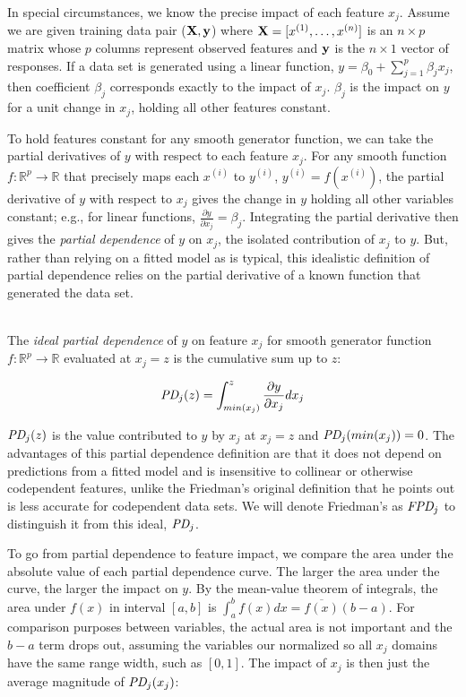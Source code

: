 \documentclass[11pt]{article}
\newcommand{\todo}[1]{{{\small\color{red}{[#1]}}}}
\renewcommand{\xi}{x^{(i)}}
\begin{document}
In special circumstances, we know the precise impact of each feature $x_j$. Assume we are given training data pair ($\bf X, y$) where ${\bf X} = [x^{(1)}, \ldots, x^{(n)}]$ is an $n \times p$ matrix whose $p$ columns represent observed features and ${\bf y}$ is the $n \times 1$ vector of responses.  If a data set is generated using a linear function, $y = \beta_0 + \sum_{j=1}^p \beta_j x_j$, \todo{assumes independence of $x_j$? I don't think so since we have complete equation} then coefficient $\beta_j$ corresponds exactly to the impact of $x_j$.  $\beta_j$ is the impact on $y$ for a unit change in $x_j$, holding all other features constant.

To hold features constant for any smooth generator function, we can take the partial derivatives of $y$ with respect to each feature $x_j$. For any smooth function $f:\mathbb{R}^{p} \rightarrow \mathbb{R}$ that precisely maps each $\xi$ to $y^{(i)}$, ${y^{(i)}} = f(\xi)$, the partial derivative of $y$ with respect to $x_j$ gives the change in $y$ holding all other variables constant; e.g., for linear functions, $\frac{\partial y}{\partial x_j}=\beta_j$. Integrating the partial derivative then gives the {\em partial dependence}  of $y$ on $x_j$, the isolated contribution of $x_j$ to $y$. But, rather than relying on a fitted model as is typical, this idealistic definition of partial dependence relies on the partial derivative of a known function that generated the data set.

~\\
 The {\em ideal partial dependence} of $y$ on feature $x_j$ for smooth generator function $f:\mathbb{R}^{p} \rightarrow \mathbb{R}$ evaluated at $x_j = z$ is the cumulative sum up to $z$:

\begin{equation}\label{eq:pd}
\text{\it PD}_j(z) = \int_{min(x_j)}^z \frac{\partial y}{\partial x_j} dx_j
\end{equation}

$\text{\it PD}_j(z)$ is the value contributed to $y$ by $x_j$ at $x_j = z$ and $\text{\it PD}_j(min(x_j))=0$. The advantages of this partial dependence definition are that it does not depend on predictions from a fitted model and is insensitive to collinear or otherwise codependent features, unlike the Friedman's original definition that he points out is less accurate for codependent data sets. We will denote Friedman's as $\text{\it FPD}_j$ to distinguish it from this ideal, $\text{\it PD}_j$.

To go from partial dependence to feature impact, we compare the area under the absolute value of each partial dependence curve. The larger the area under the curve, the larger the impact on $y$.   By the mean-value theorem of integrals, the area under $f(x)$ in interval $[a,b]$ is $\int_{a}^{b} f(x) dx = \overline{f(x)}(b-a)$.  For comparison purposes between variables, the actual area is not important and the $b-a$ term drops out, assuming the variables our normalized so all $x_j$ domains have the same range width, such as $[0,1]$. The impact of $x_j$ is then just the average magnitude of $\text{\it PD}_j(x_j)$:
\end{document}
